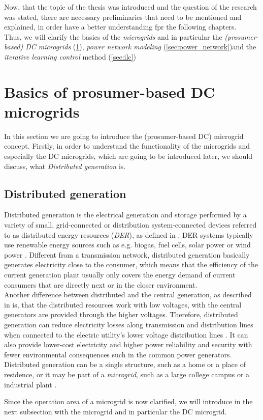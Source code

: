 \par Now, that the topic of the thesis was introduced and the question of the research was stated, there are necessary preliminaries that need to be mentioned and explained, in order have a better understanding fpr the following chapters. \\ Thus, we will clarify the basics of the \textit{microgrids} and in particular the \textit{(prosumer-based) DC microgrids} (\ref{sec:dcmicrogrids}), \textit{power network modeling} (\ref{sec:power_network})and the \textit{iterative learning control} method (\ref{sec:ilc})
 
\section{Basics of prosumer-based DC microgrids}
\label{sec:dcmicrogrids}
\par In this section we are going to introduce the (prosumer-based DC) microgrid concept. Firstly, in order to understand the functionality of the microgrids and especially the DC microgrids, which are going to be introduced later, we should discuss, what \textit{Distributed generation} is.
\subsection{Distributed generation}
\label{subsec:der}
Distributed generation is the electrical generation and storage performed by a variety of small, grid-connected or distribution system-connected devices referred to as distributed energy resources (\textit{DER}), as defined in \cite{dg_wiki}. DER systems typically use renewable energy sources such as e.g. biogas, fuel cells, solar power or wind power \cite{dg_wiki}. Different from a transmission network, distributed generation basically generates electricity close to the consumer, which means that the efficiency of the current generation plant usually only covers the energy demand of current consumers that are directly next or in the closer environment.
\\Another difference between distributed and the central generation, as described in \cite{epa_dg} is, that the distributed resources work with low voltages, with the central generators are provided through the higher voltages. Therefore, distributed generation can reduce electricity losses along transmission and distribution lines when connected to the electric utility’s lower voltage distribution lines \cite{epa_dg}. It can also provide lower-cost electricity and higher power reliability and security with fewer environmental consequences such in the common power generators. 
\\Distributed generation can be a single structure, such as a home or a place of residence, or it may be part of a \textit{microgrid}, such as a large college campus or a industrial plant \cite{dg_wiki}. \par Since the operation area of a microgrid is now clarified, we will introduce in the next subsection with the microgrid and in particular the DC microgrid.
